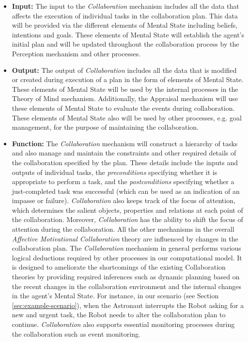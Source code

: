 \documentclass[12pt]{report}
\begin{document}
\begin{itemize}
  \item \textbf{Input:} The input to the \textit{Collaboration} mechanism
  includes all the data that affects the execution of individual tasks in the
  collaboration plan. This data will be provided via the different elements of
  Mental State including beliefs, intentions and goals. These elements of Mental
  State will establish the agent's initial plan and will be updated throughout
  the collaboration process by the Perception mechanism and other processes.
  
  \item \textbf{Output:} The output of \textit{Collaboration} includes all the
  data that is modified or created during execution of a plan in the form of
  elements of Mental State. These elements of Mental State will be used by the
  internal processes in the Theory of Mind mechanism. Additionally, the Appraisal
  mechanism will use these elements of Mental State to evaluate the events
  during collaboration. These elements of Mental State also will be used by
  other processes, e.g. goal management, for the purpose of maintaining the
  collaboration.
  
  \item \textbf{Function:} The \textit{Collaboration} mechanism will construct a
  hierarchy of tasks and also manage and maintain the constraints and other
  required details of the collaboration specified by the plan. These details
  include the inputs and outputs of individual tasks, the \textit{preconditions}
  specifying whether it is appropriate to perform a task, and the
  \textit{postconditions} specifying whether a just-completed task was
  successful (which can be used as an indication of an impasse or failure).
  \textit{Collaboration} also keeps track of the focus of attention, which
  determines the salient objects, properties and relations at each point of the
  collaboration. Moreover, \textit{Collaboration} has the ability to shift the
  focus of attention during the collaboration. All the other mechanisms in the
  overall \textit{Affective Motivational Collaboration} theory are influenced by
  changes in the collaboration plan. The \textit{Collaboration} mechanism in
  general performs various logical deductions required by other processes in our
  computational model. It is designed to ameliorate the shortcomings of the
  existing Collaboration theories by providing required inferences such as
  dynamic planning based on the recent changes in the collaboration environment
  and the internal changes in the agent's Mental State. For instance, in our
  scenario (see Section \ref{sec:example-scenario}), when the Astronaut
  interrupts the Robot asking for a new and urgent task, the Robot needs to
  alter the collaboration plan to continue. \textit{Collaboration} also supports
  essential monitoring processes during the collaboration such as event
  monitoring.
\end{itemize}
\end{document}
